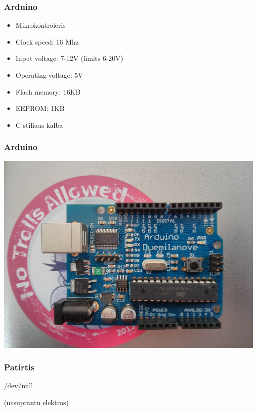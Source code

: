 \documentclass[12pt,a4paper]{beamer}
\begin{document}
\begin{frame}
    \frametitle{Arduino}

    \begin{itemize}
        \item Mikrokontroleris
        \item Clock speed: 16 Mhz
        \item Input voltage: 7-12V (limits 6-20V)
        \item Operating voltage: 5V
        \item Flash memory: 16KB
        \item EEPROM: 1KB
        \item C-stiliaus kalba
    \end{itemize}
    
\end{frame}

\begin{frame}
    \frametitle{Arduino}
    \begin{center}
        \includegraphics[scale=0.25]{img/arduino.jpg}
    \end{center}
\end{frame}

\begin{frame}
    \frametitle{Patirtis}
	\begin{center}
        {\Huge /dev/null}
	\end{center}
    \begin{center}
        (nesuprantu elektros)
    \end{center}
\end{frame}
\end{document}
